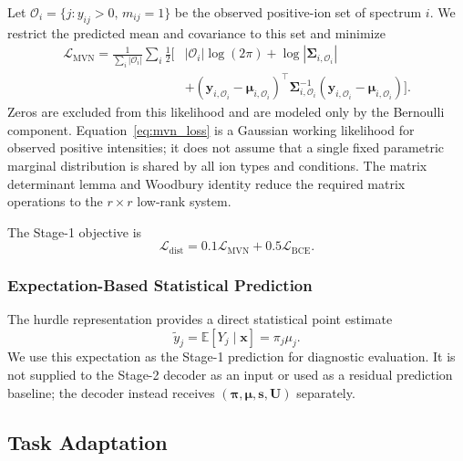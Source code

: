 Let $\mathcal{O}_i=\{j:y_{ij}>0,\,m_{ij}=1\}$ be the observed positive-ion set
of spectrum $i$. We restrict the predicted mean and covariance to this set and
minimize
\begin{equation}
\begin{split}
    \mathcal{L}_{\mathrm{MVN}}
    = \frac{1}{\sum_i |\mathcal{O}_i|}
      \sum_i \frac{1}{2}\Big[
      &|\mathcal{O}_i|\log(2\pi)
      +\log|\boldsymbol{\Sigma}_{i,\mathcal{O}_i}|\\
      &+(\mathbf{y}_{i,\mathcal{O}_i}-\boldsymbol{\mu}_{i,\mathcal{O}_i})^{\top}
      \boldsymbol{\Sigma}_{i,\mathcal{O}_i}^{-1}
      (\mathbf{y}_{i,\mathcal{O}_i}-\boldsymbol{\mu}_{i,\mathcal{O}_i})
      \Big].
\end{split}
\label{eq:mvn_loss}
\end{equation}
Zeros are excluded from this likelihood and are modeled only by the Bernoulli
component. Equation~\ref{eq:mvn_loss} is a Gaussian working likelihood for
observed positive intensities; it does not assume that a single fixed
parametric marginal distribution is shared by all ion types and conditions.
The matrix determinant lemma and Woodbury identity reduce the required matrix
operations to the $r\times r$ low-rank system.

The Stage-1 objective is
\begin{equation}
    \mathcal{L}_{\mathrm{dist}}
    = 0.1\mathcal{L}_{\mathrm{MVN}}
      +0.5\mathcal{L}_{\mathrm{BCE}}.
    \label{eq:stage1_loss}
\end{equation}

\subsubsection{Expectation-Based Statistical Prediction}
\label{sec:expectation_prediction}

The hurdle representation provides a direct statistical point estimate
\begin{equation}
    \widetilde{y}_j
    = \mathbb{E}[Y_j\mid\mathbf{x}]
    = \pi_j\mu_j.
    \label{eq:hurdle_expectation}
\end{equation}
We use this expectation as the Stage-1 prediction for diagnostic evaluation.
It is not supplied to the Stage-2 decoder as an input or used as a residual
prediction baseline; the decoder instead receives
$(\boldsymbol{\pi},\boldsymbol{\mu},\mathbf{s},\mathbf{U})$ separately.

\subsection{Task Adaptation}
\label{sec:task_adaptation}

